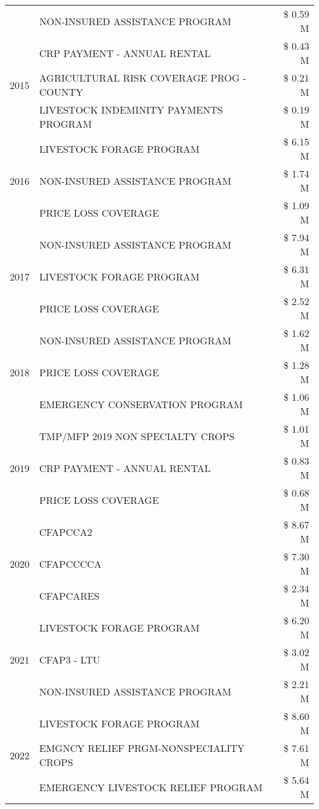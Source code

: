 \begin{tabular}{llr}
 & NON-INSURED ASSISTANCE PROGRAM & \$ 0.59 M \\
\cline{1-3}
\multirow[t]{3}{*}{2015} & CRP PAYMENT - ANNUAL RENTAL & \$ 0.43 M \\
 & AGRICULTURAL RISK COVERAGE PROG - COUNTY & \$ 0.21 M \\
 & LIVESTOCK INDEMINITY PAYMENTS PROGRAM & \$ 0.19 M \\
\cline{1-3}
\multirow[t]{3}{*}{2016} & LIVESTOCK FORAGE PROGRAM & \$ 6.15 M \\
 & NON-INSURED ASSISTANCE PROGRAM & \$ 1.74 M \\
 & PRICE LOSS COVERAGE & \$ 1.09 M \\
\cline{1-3}
\multirow[t]{3}{*}{2017} & NON-INSURED ASSISTANCE PROGRAM & \$ 7.94 M \\
 & LIVESTOCK FORAGE PROGRAM & \$ 6.31 M \\
 & PRICE LOSS COVERAGE & \$ 2.52 M \\
\cline{1-3}
\multirow[t]{3}{*}{2018} & NON-INSURED ASSISTANCE PROGRAM & \$ 1.62 M \\
 & PRICE LOSS COVERAGE & \$ 1.28 M \\
 & EMERGENCY CONSERVATION PROGRAM & \$ 1.06 M \\
\cline{1-3}
\multirow[t]{3}{*}{2019} & TMP/MFP 2019 NON SPECIALTY CROPS & \$ 1.01 M \\
 & CRP PAYMENT - ANNUAL RENTAL & \$ 0.83 M \\
 & PRICE LOSS COVERAGE & \$ 0.68 M \\
\cline{1-3}
\multirow[t]{3}{*}{2020} & CFAPCCA2 & \$ 8.67 M \\
 & CFAPCCCCA & \$ 7.30 M \\
 & CFAPCARES & \$ 2.34 M \\
\cline{1-3}
\multirow[t]{3}{*}{2021} & LIVESTOCK FORAGE PROGRAM & \$ 6.20 M \\
 & CFAP3 - LTU & \$ 3.02 M \\
 & NON-INSURED ASSISTANCE PROGRAM & \$ 2.21 M \\
\cline{1-3}
\multirow[t]{3}{*}{2022} & LIVESTOCK FORAGE PROGRAM & \$ 8.60 M \\
 & EMGNCY RELIEF PRGM-NONSPECIALITY CROPS & \$ 7.61 M \\
 & EMERGENCY LIVESTOCK RELIEF PROGRAM & \$ 5.64 M \\
\cline{1-3}
\bottomrule
\end{tabular}
